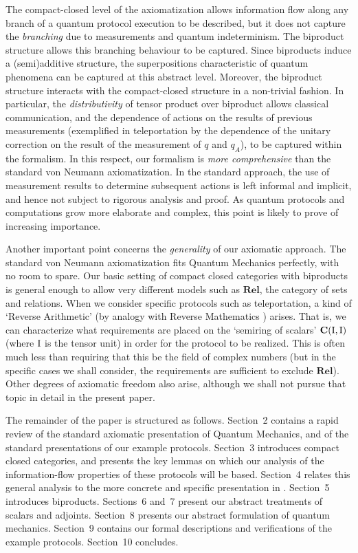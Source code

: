 \documentclass[10pt]{article}
\begin{document}
The compact-closed level of the axiomatization allows information flow 
along any branch of a quantum protocol execution to be described, but
it does not capture the \emph{branching} due to measurements and quantum
indeterminism. The biproduct structure allows this branching behaviour 
to be captured. Since biproducts induce a (semi)additive structure,
the superpositions characteristic of quantum phenomena can be
captured at this abstract level. Moreover, the biproduct structure
interacts with the compact-closed structure in a non-trivial
fashion. In particular, the \emph{distributivity} of tensor product
over biproduct allows classical communication, and the dependence of
actions on the results of previous measurements (exemplified
in teleportation by the dependence of the unitary correction on the
result of the measurement of $q$ and $q_A$), to be captured within
the formalism. In this respect, our formalism is \emph{more
comprehensive} than the standard von Neumann axiomatization. In the
standard approach, the use of measurement results to determine subsequent
actions is left informal and implicit, and hence not subject to
rigorous analysis and proof. As quantum protocols and  computations grow more
elaborate and complex, this point is likely to prove of increasing
importance. 

Another important point concerns the \emph{generality} of our
axiomatic approach. The standard von Neumann axiomatization fits
Quantum Mechanics perfectly, with no room to spare. Our basic setting
of compact closed categories with biproducts is general enough to
allow very different models such as $\mathbf{Rel}$, the category of
sets and relations. 
When we consider specific protocols such as teleportation, a kind of 
`Reverse Arithmetic' (by analogy with Reverse Mathematics \cite{RM})
arises. That is, we can characterize what requirements are placed on
the `semiring of scalars' ${\mathbf C} ({\rm I},{\rm I})$ (where ${\rm I}$ is the
tensor unit) in order for the protocol to be realized. This is often
much less than requiring that this be the field of complex numbers
(but in the specific cases we shall consider, the requirements are
sufficient to exclude $\mathbf{Rel}$).
Other degrees of axiomatic freedom also arise, although we shall not
pursue that topic in detail in the present paper.

The remainder of the paper is structured as follows. Section~2
contains a
rapid review of the standard axiomatic presentation of Quantum
Mechanics, and of the standard presentations of our example protocols.
Section~3 introduces compact closed categories, and presents the key
lemmas on which our analysis of the information-flow properties of
these protocols will be based. Section~4 relates this general analysis 
to the more concrete and specific presentation in \cite{Coe1}. Section~5
introduces biproducts.  Sections~6 and~7  present our abstract
treatments of  scalars and adjoints. Section~8 presents our abstract formulation of quantum mechanics.
Section~9 contains our
formal descriptions and verifications of the example protocols. 
Section~10 concludes.
\end{document}
